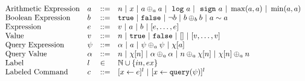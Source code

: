 \[
\begin{array}{llll}
%
%
\mbox{Arithmetic Expression} 
& \aexpr & ::= & 
n ~|~ {x} ~|~ \aexpr \oplus_a \aexpr 
~|~ \elog \aexpr  ~|~ \esign \aexpr ~|~ \max(a, a) ~|~ \min(a, a)
\\
%
\mbox{Boolean Expression} & \bexpr & ::= & 
%
\etrue ~|~ \efalse  ~|~ \neg \bexpr
 ~|~ \bexpr \oplus_b \bexpr
%
~|~ \aexpr \sim \aexpr 
\\
%
\mbox{Expression} & \expr & ::= & v ~|~ \aexpr ~|~  \bexpr ~|~ [\expr, \dots, \expr]
\\  
%
\mbox{Value} 
& v & ::= & { n ~|~  \etrue ~|~  \efalse ~|~ [] ~|~ [v, \dots, v]}  
\\
%
\mbox{Query Expression} 
& {\qexpr} & ::= 
& { \qval ~|~ \aexpr ~|~ \qexpr \oplus_a \qexpr ~|~ \chi[\aexpr]} 
\\
%
\mbox{Query Value} & \qval & ::= 
& {n ~|~ \chi[n] ~|~ \qval \oplus_a  \qval ~|~ n \oplus_a  \chi[n]
    ~|~ \chi[n] \oplus_a  n}\\
\mbox{Label} 
& l & \in & \mathbb{N} \cup \{in, ex\} \\
\mbox{Labeled Command} 
& {c} & ::= &   [\assign {{x}}{ {\expr}}]^{l} ~|~  [\assign {{x} } {{\query(\qexpr)}}]^{l}

\end{array}\]
